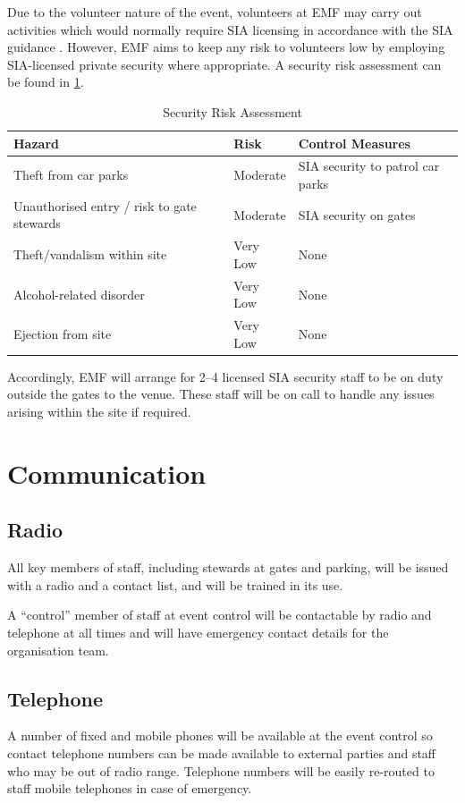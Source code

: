 Due to the volunteer nature of the event, volunteers at EMF may carry out activities which would normally
require SIA licensing in accordance with the SIA guidance \cite{sia}. However, EMF aims to keep any risk
to volunteers low by employing SIA-licensed private security where appropriate. A security risk assessment
can be found in \cref{table:security}.

\begin{table}[h!]
\caption{Security Risk Assessment}
\label{table:security}
\centering
\begin{tabular}{| l l l |}
    \hline
    \textbf{Hazard} & \textbf{Risk} & \textbf{Control Measures} \\
    \hline
    Theft from car parks & Moderate & SIA security to patrol car parks \\
    Unauthorised entry / risk to gate stewards & Moderate & SIA security on gates \\
    Theft/vandalism within site & Very Low & None \\
    Alcohol-related disorder & Very Low & None \\
    Ejection from site & Very Low & None \\
    \hline
\end{tabular}
\end{table}

Accordingly, EMF will arrange for 2--4 licensed SIA security staff to be on duty outside the gates to the
venue. These staff will be on call to handle any issues arising within the site if required.

\section{Communication}

\subsection{Radio}
All key members of staff, including stewards at gates and parking,
will be issued with a radio and a contact list, and will be trained in its use.

A ``control'' member of staff at event control will be contactable by
radio and telephone at all times and will have emergency contact details for the
organisation team.

\subsection{Telephone}
A number of fixed and mobile phones will be available at the event control so
contact telephone numbers can be made available to external parties and staff
who may be out of radio range. Telephone numbers will be easily re-routed to
staff mobile telephones in case of emergency.

